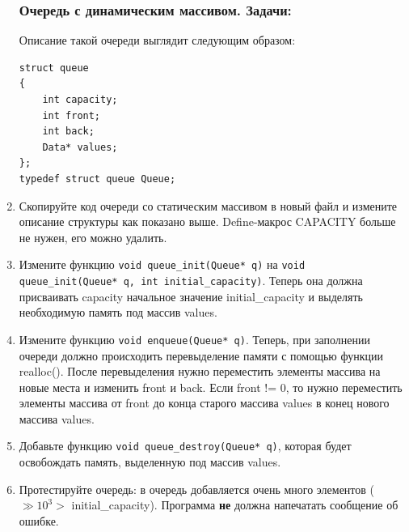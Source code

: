 \documentclass{article}
\begin{document}
\begin{enumerate}
\subsubsection*{Очередь с динамическим массивом. Задачи:}

Описание такой очереди выглядит следующим образом:
\begin{verbatim}
struct queue
{
    int capacity;
    int front;
    int back;
    Data* values;
};
typedef struct queue Queue;
\end{verbatim}

\item Скопируйте код очереди со статическим массивом в новый файл и измените описание структуры как показано выше. Define-макрос CAPACITY больше не нужен, его можно удалить.

\item Измените функцию \texttt{void queue\_init(Queue* q)} на \texttt{void queue\_init(Queue* q, int initial\_capacity)}. Теперь она должна присваивать capacity начальное значение initial\_capacity и выделять необходимую память под массив values.

\item Измените функцию \texttt{void enqueue(Queue* q)}. Теперь, при заполнении очереди должно происходить перевыделение памяти с помощью функции realloc(). После перевыделения нужно переместить элементы массива на новые места и изменить front и back. Если front != 0, то нужно переместить элементы массива от front до конца старого массива values в конец нового массива values.

\item Добавьте функцию \texttt{void queue\_destroy(Queue* q)}, которая будет освобождать память, выделенную под массив values.

\item Протестируйте очередь: в очередь добавляется очень много элементов ($\gg 10^3 >$ initial\_capacity). Программа \textbf{не} должна напечатать сообщение об ошибке.
\end{enumerate}
\end{document}
